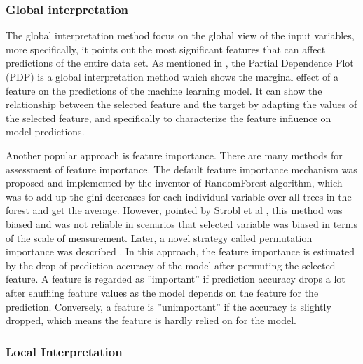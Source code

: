 \subsubsection{Global interpretation}

The global interpretation method focus on the global view of the input variables, more specifically, it points out the most significant features that can affect predictions of the entire data set. As mentioned in \cite{friedman2001greedy}, the Partial Dependence Plot (PDP) is a global interpretation method which shows the marginal effect of a feature on the predictions of the machine learning model. It can show the relationship between the selected feature and the target by adapting the values of the selected feature, and specifically to characterize the feature influence on model predictions. 

Another popular approach is feature importance. There are many methods for assessment of feature importance. The default feature importance mechanism was proposed and implemented by the inventor of RandomForest algorithm, which was to add up the gini decreases for each individual variable over all trees in the forest and get the average. However, pointed by Strobl et al \cite{strobl2007bias}, this method was biased and was not reliable in scenarios that selected variable was biased in terms of the scale of measurement. Later, a novel strategy called permutation importance was described \cite{fisher2018model}. In this approach, the feature importance is estimated by the drop of prediction accuracy of the model after permuting the selected feature. A feature is regarded as ”important” if prediction accuracy drops a lot after shuffling feature values as the model depends on the feature for the prediction. Conversely, a feature is ”unimportant” if the accuracy is slightly dropped, which means the feature is hardly relied on for the model.


\subsubsection{Local Interpretation}

